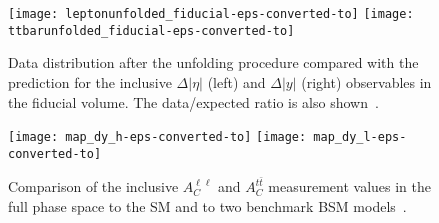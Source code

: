 \documentclass[12pt]{article}
\begin{document}
\begin{figure}[htb]
\centering
\texttt{[image: leptonunfolded\_fiducial-eps-converted-to]}
\texttt{[image: ttbarunfolded\_fiducial-eps-converted-to]}

\caption{Data distribution after the unfolding procedure compared with the prediction for the inclusive $\Delta|\eta|$ (left) and $\Delta|y|$ (right) observables in the fiducial volume. The data/expected ratio is also
shown~\cite{Aad:2016ove}.}
\label{fig:distribution}
\end{figure}


\begin{figure}[htb]
\centering
\texttt{[image: map\_dy\_h-eps-converted-to]}
\texttt{[image: map\_dy\_l-eps-converted-to]}

\caption{Comparison of the inclusive $A_C^{\ell \ell}$ and $A_C^{t\bar{t}}$ measurement values in the full phase space to the SM  and to two benchmark BSM models~\cite{Aad:2016ove}. }
\label{fig:2d}
\end{figure}
\end{document}
